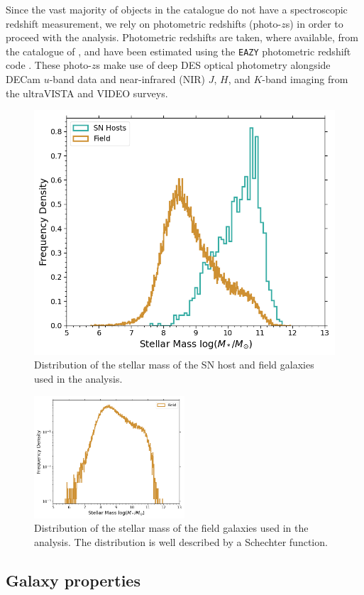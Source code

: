 \documentclass[fleqn,usenatbib]{mnras}
\begin{document}
Since the vast majority of objects in the \citet{Wiseman2021} catalogue do not have a spectroscopic redshift measurement, we rely on photometric redshifts (photo-$z$s) in order to proceed with the analysis. 
Photometric redshifts are taken, where available, from the catalogue of \citet{Hartley2020}, and have been estimated using the \texttt{EAZY} photometric redshift code \citep{Brammer2008}. These photo-$z$s make use of deep DES optical photometry alongside DECam $u$-band data and near-infrared (NIR) $J$, $H$, and $K$-band imaging from the ultraVISTA and VIDEO surveys. 

\begin{figure}
    \centering
    \includegraphics[width=.5\textwidth]{figs/mass_hist_sn_field_BC03.png}
    \caption{Distribution of the stellar mass of the SN host and field galaxies used in the analysis. }
    \label{fig:mass_hist_hosts_field}
\end{figure}

\begin{figure}
    \centering
    \includegraphics[width=0.5\textwidth]{figs/mass_hist_log_BC03.png}
    \caption{Distribution of the stellar mass of the field galaxies used in the analysis. The distribution is well described by a Schechter function.
    \label{fig:log_mass_field}}
\end{figure}

\subsection{Galaxy properties \label{subsec:properties}}
\end{document}
